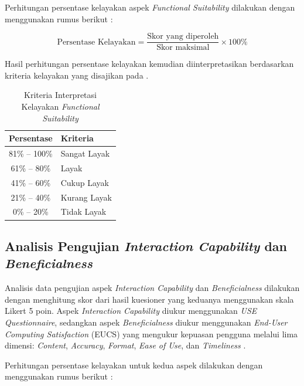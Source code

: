 Perhitungan persentase kelayakan aspek \textit{Functional Suitability} dilakukan dengan menggunakan rumus berikut \citep{Lamada_2020_ISO25010}:

\begin{equation}
	\text{Persentase Kelayakan} = \frac{\text{Skor yang diperoleh}}{\text{Skor maksimal}} \times 100\%
	\label{eq:functional_suitability}
\end{equation}

Hasil perhitungan persentase kelayakan kemudian diinterpretasikan berdasarkan kriteria kelayakan yang disajikan pada .

\begin{table}[H]
	\centering
	\caption{Kriteria Interpretasi Kelayakan \textit{Functional Suitability}}
	\label{tab:kriteria_functional}
	\begin{tabular}{|c|l|}
		\hline
		\textbf{Persentase} & \textbf{Kriteria} \\
		\hline
		81\% -- 100\%       & Sangat Layak      \\
		\hline
		61\% -- 80\%        & Layak             \\
		\hline
		41\% -- 60\%        & Cukup Layak       \\
		\hline
		21\% -- 40\%        & Kurang Layak      \\
		\hline
		0\% -- 20\%         & Tidak Layak       \\
		\hline
	\end{tabular}
\end{table}

\subsection{Analisis Pengujian \textit{Interaction Capability} dan \textit{Beneficialness}}

Analisis data pengujian aspek \textit{Interaction Capability} dan \textit{Beneficialness} dilakukan dengan menghitung skor dari hasil kuesioner yang keduanya menggunakan skala Likert 5 poin. Aspek \textit{Interaction Capability} diukur menggunakan \textit{USE Questionnaire}, sedangkan aspek \textit{Beneficialness} diukur menggunakan \textit{End-User Computing Satisfaction} (EUCS) yang mengukur kepuasan pengguna melalui lima dimensi: \textit{Content}, \textit{Accuracy}, \textit{Format}, \textit{Ease of Use}, dan \textit{Timeliness} \citep{Doll_Torkzadeh_1988_EUCS, Hidayah_2020_EUCS}.

Perhitungan persentase kelayakan untuk kedua aspek dilakukan dengan menggunakan rumus berikut \citep{Ghaffur_2017_USEQuestionnaire}:

